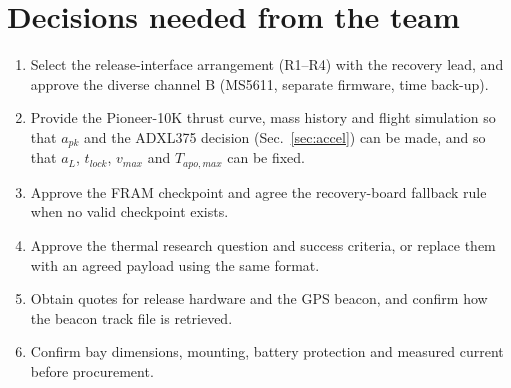 \section{Decisions needed from the team}
\begin{enumerate}
\item Select the release-interface arrangement (R1--R4) with the recovery lead, and approve the diverse channel B (MS5611, separate firmware, time back-up).
\item Provide the Pioneer-10K thrust curve, mass history and flight simulation so that $a_{pk}$ and the ADXL375 decision (Sec.~\ref{sec:accel}) can be made, and so that $a_L$, $t_{lock}$, $v_{max}$ and $T_{apo,max}$ can be fixed.
\item Approve the FRAM checkpoint and agree the recovery-board fallback rule when no valid checkpoint exists.
\item Approve the thermal research question and success criteria, or replace them with an agreed payload using the same format.
\item Obtain quotes for release hardware and the GPS beacon, and confirm how the beacon track file is retrieved.
\item Confirm bay dimensions, mounting, battery protection and measured current before procurement.
\end{enumerate}

\printbibliography[title={References}]

